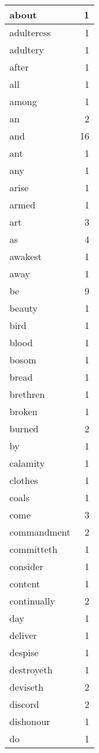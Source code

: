 \begin{center}
\begin{longtable}{l|r}
about & 1\\ \hline 
adulteress & 1\\ \hline 
adultery & 1\\ \hline 
after & 1\\ \hline 
all & 1\\ \hline 
among & 1\\ \hline 
an & 2\\ \hline 
and & 16\\ \hline 
ant & 1\\ \hline 
any & 1\\ \hline 
arise & 1\\ \hline 
armed & 1\\ \hline 
art & 3\\ \hline 
as & 4\\ \hline 
awakest & 1\\ \hline 
away & 1\\ \hline 
be & 9\\ \hline 
beauty & 1\\ \hline 
bird & 1\\ \hline 
blood & 1\\ \hline 
bosom & 1\\ \hline 
bread & 1\\ \hline 
brethren & 1\\ \hline 
broken & 1\\ \hline 
burned & 2\\ \hline 
by & 1\\ \hline 
calamity & 1\\ \hline 
clothes & 1\\ \hline 
coals & 1\\ \hline 
come & 3\\ \hline 
commandment & 2\\ \hline 
committeth & 1\\ \hline 
consider & 1\\ \hline 
content & 1\\ \hline 
continually & 2\\ \hline 
day & 1\\ \hline 
deliver & 1\\ \hline 
despise & 1\\ \hline 
destroyeth & 1\\ \hline 
deviseth & 2\\ \hline 
discord & 2\\ \hline 
dishonour & 1\\ \hline 
do & 1\\ \hline 

\end{longtable}
\end{center}
